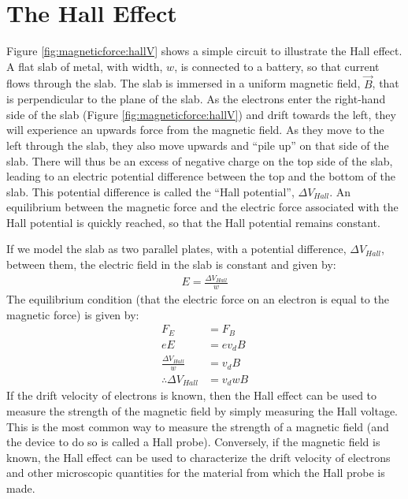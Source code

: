 \section{The Hall Effect}
Figure \ref{fig:magneticforce:hallV} shows a simple circuit to illustrate the Hall effect. A flat slab of metal, with width, $w$, is connected to a battery, so that current flows through the slab. The slab is immersed in a uniform magnetic field, $\vec B$, that is perpendicular to the plane of the slab.
As the electrons enter the right-hand side of the slab (Figure \ref{fig:magneticforce:hallV}) and drift towards the left, they will experience an upwards force from the magnetic field. As they move to the left through the slab, they also move upwards and ``pile up'' on that side of the slab. There will thus be an excess of negative charge on the top side of the slab, leading to an electric potential difference between the top and the bottom of the slab. This potential difference is called the ``Hall potential'', $\Delta V_{Hall}$. An equilibrium between the magnetic force and the electric force associated with the Hall potential is quickly reached, so that the Hall potential remains constant.

If we model the slab as two parallel plates, with a potential difference, $\Delta V_{Hall}$, between them, the electric field in the slab is constant and given by:
\begin{align*}
E= \frac{\Delta V_{Hall}}{w}
\end{align*}
The equilibrium condition (that the electric force on an electron is equal to the magnetic force) is given by:
\begin{align*}
F_E &= F_B\\
eE &= ev_dB\\
\frac{\Delta V_{Hall}}{w} &= v_d B\\
\therefore \Delta V_{Hall}&= v_d wB
\end{align*}
If the drift velocity of electrons is known, then the Hall effect can be used to measure the strength of the magnetic field by simply measuring the Hall voltage. This is the most common way to measure the strength of a magnetic field (and the device to do so is called a Hall probe). Conversely, if the magnetic field is known, the Hall effect can be used to characterize the drift velocity of electrons and other microscopic quantities for the material from which the Hall probe is made.

